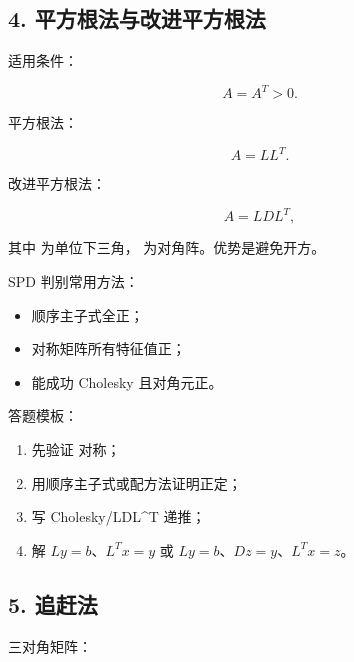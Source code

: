 \documentclass[11pt,a4paper]{ctexart}
\newcommand{\code}[1]{\begingroup\ttfamily\small #1\endgroup}
\begin{document}

\subsection*{4. 平方根法与改进平方根法}


适用条件：

\[
A=A^T>0.
\]

平方根法：

\[
A=LL^T.
\]

改进平方根法：

\[
A=LDL^T,
\]

其中 \code{} 为单位下三角，\code{} 为对角阵。优势是避免开方。

SPD 判别常用方法：

\begin{itemize}

\item 顺序主子式全正；

\item 对称矩阵所有特征值正；

\item 能成功 Cholesky 且对角元正。

\end{itemize}

答题模板：

\begin{enumerate}

\item 先验证 \code{} 对称；

\item 用顺序主子式或配方法证明正定；

\item 写 Cholesky/LDL\textasciicircum{}T 递推；

\item 解 $Ly=b$、$L^Tx=y$ 或 $Ly=b$、$Dz=y$、$L^Tx=z$。

\end{enumerate}


\subsection*{5. 追赶法}


三对角矩阵：
\end{document}
